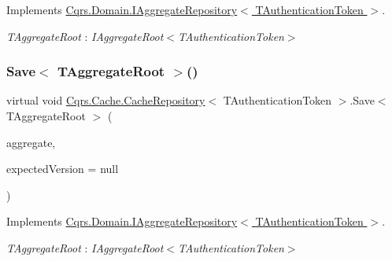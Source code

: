 Implements \hyperlink{interfaceCqrs_1_1Domain_1_1IAggregateRepository_a890633fddbd05bd3b9e9968a2de095bb_a890633fddbd05bd3b9e9968a2de095bb}{Cqrs.\+Domain.\+I\+Aggregate\+Repository$<$ T\+Authentication\+Token $>$}.

\begin{Desc}
\item[Type Constraints]\begin{description}
\item[{\em T\+Aggregate\+Root} : {\em I\+Aggregate\+Root$<$T\+Authentication\+Token$>$}]\end{description}
\end{Desc}
\mbox{\label{classCqrs_1_1Cache_1_1CacheRepository_a69df7ee1dc2e4cd38431ab987655eab3_a69df7ee1dc2e4cd38431ab987655eab3}} 
\subsubsection{\texorpdfstring{Save$<$ T\+Aggregate\+Root $>$()}{Save< TAggregateRoot >()}}
{\footnotesize\ttfamily virtual void \hyperlink{classCqrs_1_1Cache_1_1CacheRepository}{Cqrs.\+Cache.\+Cache\+Repository}$<$ T\+Authentication\+Token $>$.Save$<$ T\+Aggregate\+Root $>$ (\begin{DoxyParamCaption}\item[{T\+Aggregate\+Root}]{aggregate,  }\item[{int?}]{expected\+Version = {\ttfamily null} }\end{DoxyParamCaption})\hspace{0.3cm}{\ttfamily [virtual]}}



Implements \hyperlink{interfaceCqrs_1_1Domain_1_1IAggregateRepository_a306baf8aa6faabe893f93e5db5d3517d_a306baf8aa6faabe893f93e5db5d3517d}{Cqrs.\+Domain.\+I\+Aggregate\+Repository$<$ T\+Authentication\+Token $>$}.

\begin{Desc}
\item[Type Constraints]\begin{description}
\item[{\em T\+Aggregate\+Root} : {\em I\+Aggregate\+Root$<$T\+Authentication\+Token$>$}]\end{description}
\end{Desc}
